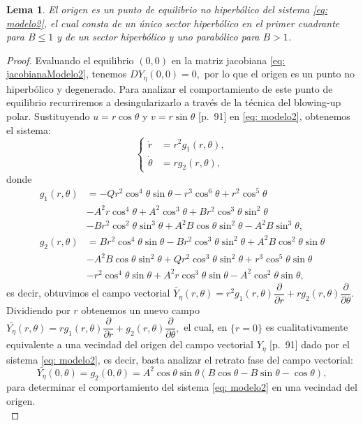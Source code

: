 \documentclass[]{article}
\newtheorem{lemma}{Lema}[section]
\theoremstyle{remark}
\begin{document}
	\begin{lemma}
		El origen es un punto de equilibrio no hiperbólico del sistema \eqref{eq: modelo2}, el cual consta de un único sector hiperbólico en el primer cuadrante para $B \leq 1$ y de un sector hiperbólico y uno parabólico para $B>1$.
	\end{lemma}
	\begin{proof}
		Evaluando el equilibrio $(0,0)$ en la matriz jacobiana \eqref{eq: jacobianaModelo2}, tenemos $DY_\eta(0,0)=0,$ por lo que el origen es un punto no hiperbólico y degenerado. Para analizar el comportamiento de este punto de equilibrio recurriremos a desingularizarlo a través de la técnica del blowing-up polar.
		Sustituyendo $u = r \cos\theta$ y $v = r \sin\theta$ \cite{dumortier}[p.~91] en \eqref{eq: modelo2}, obtenemos el sistema:
		\begin{equation*}
			\begin{cases}
				\dot{r} &= r^{2} g_1(r, \theta), \\
				\dot{\theta} &= r g_2(r, \theta),
			\end{cases}
		\end{equation*}
		donde
		\begin{equation*}
			\begin{aligned}
				g_1(r, \theta) &= -Qr^{2}\cos^{4}\theta\sin\theta- r^{3}\cos^{6}\theta+ r^{2}\cos^{5}\theta \\ &-A^{2}r\cos^{4}\theta+ A^{2}\cos^{3}\theta + Br^{2}\cos^{3}\theta\sin^{2}\theta \\ &-Br^{2}\cos^{2}\theta\sin^{3}\theta+ A^{2}B\cos\theta\sin^{2}\theta- A^{2}B\sin^{3}\theta,
				\\
				g_2(r, \theta) &= Br^{2}\cos^{4}\theta\sin\theta- Br^{2}\cos^{3}\theta\sin^{2}\theta+ A^{2}B\cos^{2}\theta\sin\theta \\ &-A^{2}B\cos\theta\sin^{2}\theta+ Qr^{2}\cos^{3}\theta\sin^{2}\theta + r^{3}\cos^{5}\theta\sin\theta \\ &-r^{2}\cos^{4}\theta\sin\theta+ A^{2}r\cos^{3}\theta\sin\theta- A^{2}\cos^{2}\theta\sin\theta,
			\end{aligned}
		\end{equation*}
		es decir, obtuvimos el campo vectorial $\tilde{Y_{\eta}}(r,\theta) = r^{2}g_1(r,\theta) \dfrac{\partial}{\partial r} + rg_2(r,\theta) \dfrac{\partial}{\partial \theta}.$ Dividiendo por $r$ obtenemos un nuevo campo $\bar{Y_{\eta}}(r,\theta) = rg_1(r,\theta) \dfrac{\partial}{\partial r} + g_2(r,\theta) \dfrac{\partial}{\partial \theta},$ el cual, en $\{r=0\}$ es cualitativamente equivalente a una vecindad del origen del campo vectorial $Y_{\eta}$ \cite{dumortier}[p.~91] dado por el sistema \eqref{eq: modelo2}, es decir, basta analizar el retrato fase del campo vectorial:
		\begin{equation*}
			\bar{Y_{\eta}}(0,\theta) = g_2(0, \theta) = A^{2}\cos\theta\sin\theta (B\cos\theta-B\sin\theta-\cos\theta),
		\end{equation*}
		para determinar el comportamiento del sistema \eqref{eq: modelo2} en una vecindad del origen.\\
		

\end{proof}
\end{document}
